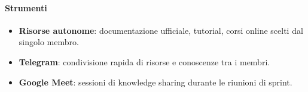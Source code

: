 \documentclass[a4paper, 11pt, oneside]{scrartcl}
\begin{document}
\paragraph{Strumenti}
\begin{itemize}
    \item \textbf{Risorse autonome}: documentazione ufficiale, tutorial, corsi online scelti dal singolo membro.
    \item \textbf{Telegram}: condivisione rapida di risorse e conoscenze tra i membri.
    \item \textbf{Google Meet}: sessioni di knowledge sharing durante le riunioni di sprint.
\end{itemize}
\end{document}
